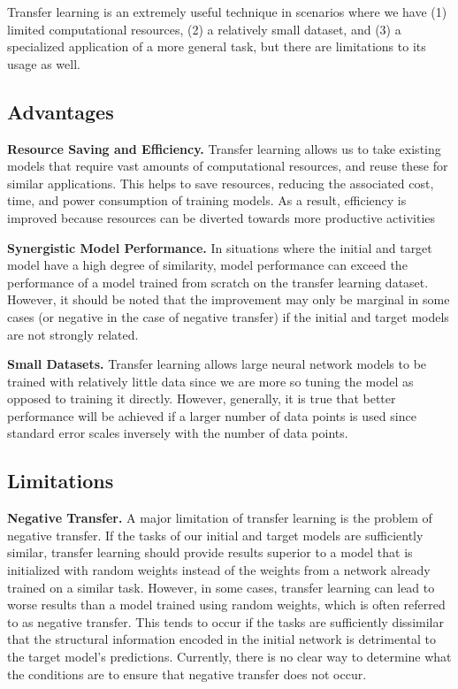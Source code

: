 {{{{    Transfer learning is an extremely useful technique in scenarios where we have (1) limited computational resources, (2) a relatively small dataset, and (3) a specialized application of a more general task, but there are limitations to its usage as well.
    
    \subsection{Advantages}
    
    \textbf{Resource Saving and Efficiency.}     Transfer learning allows us to take existing models that require vast amounts of computational resources, and reuse these for similar applications. This helps to save resources, reducing the associated cost, time, and power consumption of training models. As a result, efficiency is improved because resources can be diverted towards more productive activities
    
    \textbf{Synergistic Model Performance.} In situations where the initial and target model have a high degree of similarity, model performance can exceed the performance of a model trained from scratch on the transfer learning dataset. However, it should be noted that the improvement may only be marginal in some cases (or negative in the case of negative transfer) if the initial and target models are not strongly related.
    
    \textbf{Small Datasets.} Transfer learning allows large neural network models to be trained with relatively little data since we are more so tuning the model as opposed to training it directly. However, generally, it is true that better performance will be achieved if a larger number of data points is used since standard error scales inversely with the number of data points.
    
    \subsection{Limitations}
    
    \textbf{Negative Transfer.} A major limitation of transfer learning is the problem of negative transfer. If the tasks of our initial and target models are sufficiently similar, transfer learning should provide results superior to a model that is initialized with random weights instead of the weights from a network already trained on a similar task. However, in some cases, transfer learning can lead to worse results than a model trained using random weights, which is often referred to as negative transfer. This tends to occur if the tasks are sufficiently dissimilar that the structural information encoded in the initial network is detrimental to the target model’s predictions. Currently, there is no clear way to determine what the conditions are to ensure that negative transfer does not occur.
    
}}}}
